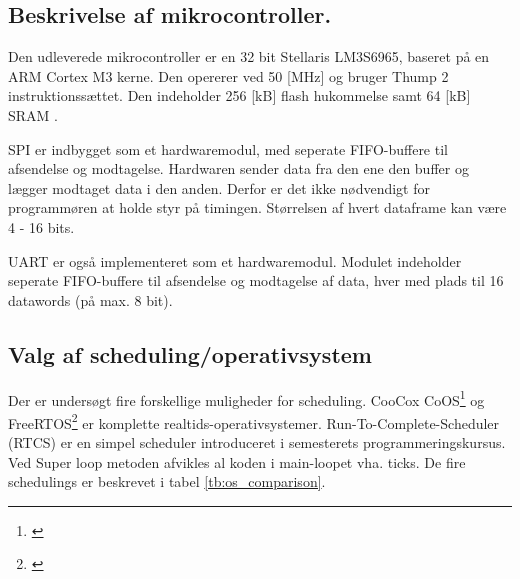 \subsection{Beskrivelse af mikrocontroller.}
Den udleverede mikrocontroller er en 32 bit Stellaris LM3S6965, baseret på en ARM Cortex M3 kerne. Den opererer ved 50 [MHz] og bruger Thump 2 instruktionssættet. Den indeholder 256 [kB] flash hukommelse samt 64 [kB] SRAM \citep{lm3s6965}.

SPI er indbygget som et hardwaremodul, med seperate FIFO-buffere til afsendelse og modtagelse. Hardwaren sender data fra den ene den buffer og lægger modtaget data i den anden. Derfor er det ikke nødvendigt for programmøren at holde styr på timingen. Størrelsen af hvert dataframe kan være 4 - 16 bits. 

UART er også implementeret som et hardwaremodul. Modulet indeholder seperate FIFO-buffere til afsendelse og modtagelse af data, hver med plads til 16 datawords (på max. 8 bit). 

\subsection{Valg af scheduling/operativsystem}
Der er undersøgt fire forskellige muligheder for scheduling.
CooCox CoOS\footnote{\citep{www.coocox.com/CoOS.htm}} og FreeRTOS\footnote{\citep{freertos.org}}
er komplette realtids-operativsystemer. 
Run-To-Complete-Scheduler (RTCS) er en simpel scheduler introduceret i semesterets programmeringskursus.
Ved Super loop metoden afvikles al koden i main-loopet vha. ticks.
De fire schedulings er beskrevet i tabel \ref{tb:os_comparison}.

